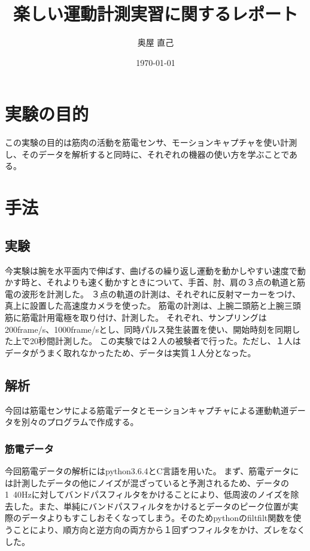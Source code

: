 \documentclass{jsarticle}
\title{楽しい運動計測実習に関するレポート}
\date{\today}
\author{奥屋 直己}
\begin{document}
\maketitle

\section{実験の目的}

この実験の目的は筋肉の活動を筋電センサ、モーションキャプチャを使い計測し、そのデータを解析すると同時に、それぞれの機器の使い方を学ぶことである。

\section{手法}

\subsection{実験}

今実験は腕を水平面内で伸ばす、曲げるの繰り返し運動を動かしやすい速度で動かす時と、それよりも速く動かすときについて、手首、肘、肩の３点の軌道と筋電の波形を計測した。
３点の軌道の計測は、それぞれに反射マーカーをつけ、真上に設置した高速度カメラを使った。
筋電の計測は、上腕二頭筋と上腕三頭筋に筋電計用電極を取り付け、計測した。
それぞれ、サンプリングは200frame/s、1000frame/sとし、同時パルス発生装置を使い、開始時刻を同期した上で20秒間計測した。
この実験では２人の被験者で行った。ただし、１人はデータがうまく取れなかったため、データは実質１人分となった。
\subsection{解析}

今回は筋電センサによる筋電データとモーションキャプチャによる運動軌道データを別々のプログラムで作成する。

\subsubsection{筋電データ}

今回筋電データの解析にはpython3.6.4とC言語を用いた。
まず、筋電データには計測したデータの他にノイズが混ざっていると予測されるため、データの1~40Hzに対してバンドパスフィルタをかけることにより、低周波のノイズを除去した。また、単純にバンドパスフィルタをかけるとデータのピーク位置が実際のデータよりもすこしおそくなってしまう。そのためpythonのfiltfilt関数を使うことにより、順方向と逆方向の両方から１回ずつフィルタをかけ、ズレをなくした。
\end{document}
